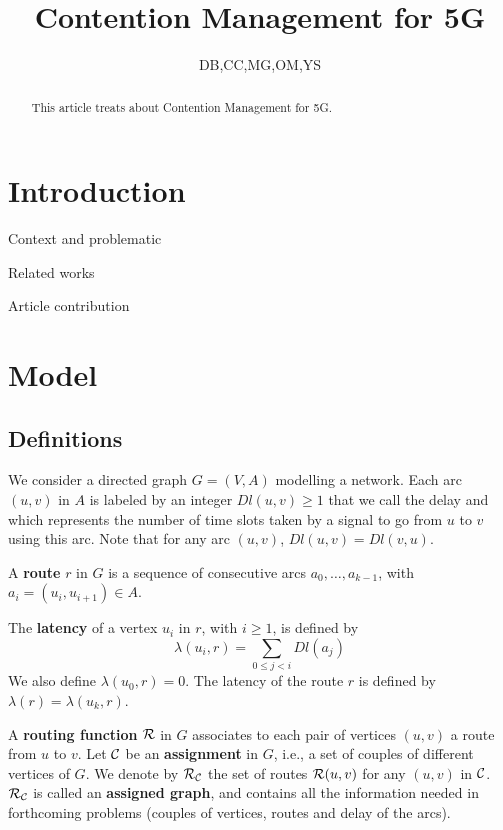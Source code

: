 \documentclass[a4paper,10pt]{article}
\title{Contention Management for 5G}
\author{DB,CC,MG,OM,YS}
\begin{document}
\maketitle

\begin{abstract}
This article treats about Contention Management for 5G.
\end{abstract}

\section{Introduction}
  \itemize
    \item Context and problematic
    \item Related works
    \item Article contribution

\section{Model}

  \subsection{Definitions}
  
	We consider a directed graph $G=(V,A)$ modelling a network. Each arc  $(u,v)$ in $A$ is labeled by an integer $Dl(u,v) \geq 1$ that we call the delay and
	which represents the number of time slots taken by a signal to go from $u$ to $v$ using this arc. Note that for any arc $(u,v)$, $Dl(u,v)=Dl(v,u)$.
	
      A {\bf route} $r$ in $G$ is a sequence of consecutive arcs $a_0, \ldots , a_{k-1}$, with $a_i=(u_i,u_{i+1}) \in A$. 
      
      The {\bf latency} of a vertex $u_i$ in $r$, with $i \geq 1$, is defined by $$\lambda(u_i,r)= \sum\limits_{0 \leq j <i} Dl(a_j)$$ We also define $\lambda(u_0,r)=0$.
      The latency of the route $r$ is defined by $\lambda (r)= \lambda (u_k,r)$.
      

      A {\bf routing function} $\cal R$ in $G$ associates to each pair of vertices $(u,v)$ a route from $u$ to $v$. Let $\cal C$ be an {\bf assignment} in $G$, i.e., a set of couples of different vertices of $G$. We denote by $\cal R_{\cal C}$ the set of routes ${\cal R}(u,v)$ for any $(u,v)$ in $\cal C$. $\cal R_{\cal C}$ is called an {\bf assigned graph}, and contains all the information needed in forthcoming problems (couples of vertices, routes and delay of the arcs).
      
\end{document}
